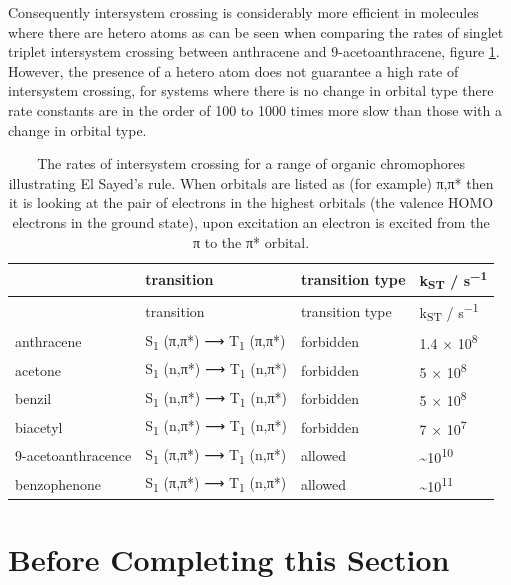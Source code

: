 \documentclass[
]{book}
\begin{document}
Consequently intersystem crossing is considerably more efficient in molecules where there are hetero atoms as can be seen when comparing the rates of singlet triplet intersystem crossing between anthracene and 9-acetoanthracene, figure \ref{tab:rateST}. However, the presence of a hetero atom does not guarantee a high rate of intersystem crossing, for systems where there is no change in orbital type there rate constants are in the order of 100 to 1000 times more slow than those with a change in orbital type.

\begin{longtable}[]{@{}llll@{}}
\caption{\label{tab:rateST} The rates of intersystem crossing for a range of organic chromophores illustrating El Sayed's rule. When orbitals are listed as (for example) π,π* then it is looking at the pair of electrons in the highest orbitals (the valence HOMO electrons in the ground state), upon excitation an electron is excited from the π to the π* orbital.}\tabularnewline
\toprule
& transition & transition type & k\textsubscript{ST} / s\textsuperscript{−1} \\
\midrule
\endfirsthead
\toprule
& transition & transition type & k\textsubscript{ST} / s\textsuperscript{−1} \\
\midrule
\endhead
anthracene & S\textsubscript{1} (π,π*) ⟶ T\textsubscript{1} (π,π*) & forbidden & 1.4 × 10\textsuperscript{8} \\
acetone & S\textsubscript{1} (n,π*) ⟶ T\textsubscript{1} (n,π*) & forbidden & 5 × 10\textsuperscript{8} \\
benzil & S\textsubscript{1} (n,π*) ⟶ T\textsubscript{1} (n,π*) & forbidden & 5 × 10\textsuperscript{8} \\
biacetyl & S\textsubscript{1} (n,π*) ⟶ T\textsubscript{1} (n,π*) & forbidden & 7 × 10\textsuperscript{7} \\
9-acetoanthracence & S\textsubscript{1} (π,π*) ⟶ T\textsubscript{1} (n,π*) & allowed & \textasciitilde10\textsuperscript{10} \\
benzophenone & S\textsubscript{1} (π,π*) ⟶ T\textsubscript{1} (n,π*) & allowed & \textasciitilde10\textsuperscript{11} \\
\bottomrule
\end{longtable}

\hypertarget{before-completing-this-section}{%
\section{Before Completing this Section}\label{before-completing-this-section}}
\end{document}

